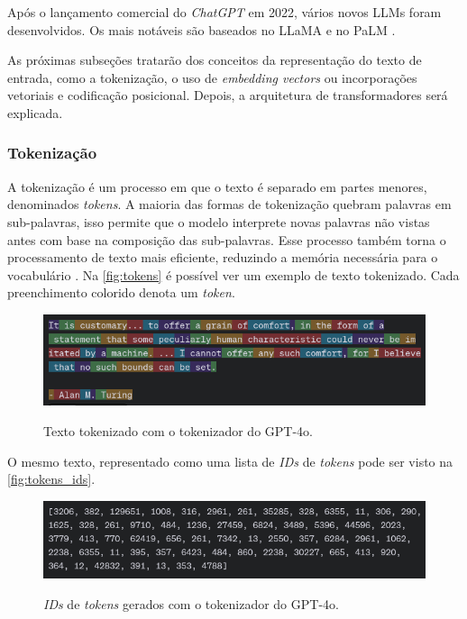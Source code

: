 Após o lançamento comercial do \textit{ChatGPT} em 2022, vários novos \acp{LLM} foram desenvolvidos. Os mais notáveis são baseados no \ac{LLaMA} e no \ac{PaLM}
\cite{llm_survey_2024}.

As próximas subseções tratarão dos conceitos da representação do texto de entrada, como a tokenização, o uso de \textit{embedding vectors} ou incorporações vetoriais e
codificação posicional. Depois, a arquitetura de transformadores será explicada.

\subsubsection{Tokenização}

A tokenização é um processo em que o texto é separado em partes menores, denominados \textit{tokens}. A maioria das formas de tokenização quebram palavras em
sub-palavras, isso permite que o modelo interprete novas palavras não vistas antes com base na composição das sub-palavras. Esse processo também torna o processamento de
texto mais eficiente, reduzindo a memória necessária para o vocabulário \cite{tokenizer_performance}. Na \autoref{fig:tokens} é possível ver um exemplo de texto
tokenizado. Cada preenchimento colorido denota um \textit{token}.

\clearpage

\begin{figure}[ht]
      \centering
      \caption{\small Texto tokenizado com o tokenizador do \ac{GPT}-4o.}
      \includegraphics[width=0.7\columnwidth,keepaspectratio]{images/tokens.png}
      \label{fig:tokens}
\end{figure}

O mesmo texto, representado como uma lista de \textit{IDs} de \textit{tokens} pode ser visto na \autoref{fig:tokens_ids}.

\begin{figure}[ht]
      \centering
      \caption{\small \textit{IDs} de \textit{tokens} gerados com o tokenizador do \ac{GPT}-4o.}
      \includegraphics[width=0.7\columnwidth,keepaspectratio]{images/tokens_ids.png}
      \label{fig:tokens_ids}
\end{figure}

